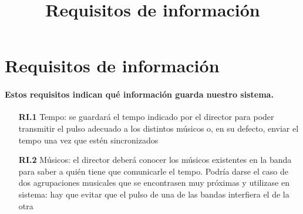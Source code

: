 \title{Requisitos de información}
\section{Requisitos de información}

\paragraph{
  Estos requisitos indican qué información guarda nuestro sistema.
}

  \begin{itemize}
    \item[\textbf{RI.1}] Tempo: se guardará el tempo indicado por el director
    para poder transmitir el pulso adecuado a los distintos músicos o, en su defecto,
    enviar el tempo una vez que estén sincronizados
    \item[\textbf{RI.2}] Músicos: el director deberá conocer los músicos existentes en la banda
    para saber a quién tiene que comunicarle el tempo. Podría darse el caso de dos
    agrupaciones musicales que se encontrasen muy próximas y utilizase en sistema:
    hay que evitar que el pulso de una de las bandas interfiera el de la otra
  \end{itemize}
